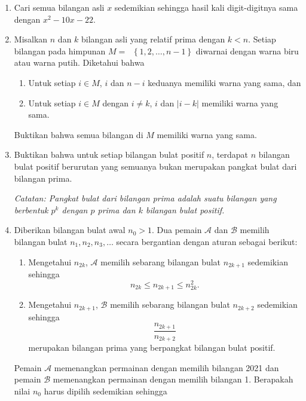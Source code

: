 \documentclass[12pt]{article}
\newcommand*\lrbr[1]{\mathop{}\!\left\lbrace#1\right\rbrace}
\begin{document}
\begin{enumerate}[leftmargin=*]
		
		
		
		
		
		
		
		
		
		
		
		
		
		\item Cari semua bilangan asli $ x $ sedemikian sehingga hasil kali digit-digitnya sama dengan $ x^{2} - 10x - 22 $.
		\item Misalkan $ n $ dan $ k $ bilangan asli yang relatif prima dengan $ k < n $. Setiap bilangan pada himpunan $ M = \lrbr{1, 2, \dots, n - 1} $ diwarnai dengan warna biru atau warna putih. Diketahui bahwa
		\begin{enumerate}
			\item Untuk setiap $ i \in M $, $ i $ dan $ n - i $ keduanya memiliki warna yang sama, dan
			\item Untuk setiap $ i \in M $ dengan $ i \ne k $, $ i $ dan $ \left|i - k\right| $ memiliki warna yang sama.
		\end{enumerate}
		Buktikan bahwa semua bilangan di $ M $ memiliki warna yang sama.
		\item Buktikan bahwa untuk setiap bilangan bulat positif $ n $, terdapat $ n $ bilangan bulat positif berurutan yang semuanya bukan merupakan pangkat bulat dari bilangan prima.
		\par \noindent \textit{Catatan: Pangkat bulat dari bilangan prima adalah suatu bilangan yang berbentuk $ p^{k} $ dengan $ p $ prima dan $ k $ bilangan bulat positif.}
		\item Diberikan bilangan bulat awal $ n_{0} > 1 $. Dua pemain $ \mathcal{A} $ dan $ \mathcal{B} $ memilih bilangan bulat $ n_{1}, n_{2}, n_{3}, \dots $ secara bergantian dengan aturan sebagai berikut:
		\begin{enumerate}
			\item Mengetahui $ n_{2k} $, $ \mathcal{A} $ memilih sebarang bilangan bulat $ n_{2k + 1} $ sedemikian sehingga
			\[ n_{2k} \leq n_{2k + 1} \leq n_{2k}^{2}. \]
			\item Mengetahui $ n_{2k + 1} $, $ \mathcal{B} $ memilih sebarang bilangan bulat $ n_{2k + 2} $ sedemikian sehingga
			\[ \frac{n_{2k + 1}}{n_{2k + 2}} \]
			merupakan bilangan prima yang berpangkat bilangan bulat positif.
		\end{enumerate}
		Pemain $ \mathcal{A} $ memenangkan permainan dengan memilih bilangan 2021 dan pemain $ \mathcal{B} $ memenangkan permainan dengan memilih bilangan 1. Berapakah nilai $ n_{0} $ harus dipilih sedemikian sehingga

\end{enumerate}
\end{document}
